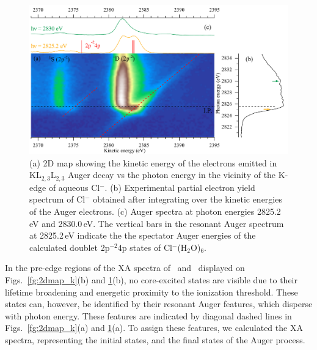 \begin{figure}[h!]
\centering
\includegraphics[scale=0.55]{figures/cl_2dmap.pdf}
\caption{(a) 2D map showing the kinetic energy of the electrons emitted in KL$_{2,3}$L$_{2,3}$ Auger decay vs the photon energy in the vicinity of the K-edge of aqueous Cl$^{-}$. 
(b) Experimental partial electron yield spectrum of Cl$^{-}$ obtained after integrating over the kinetic energies of the Auger electrons. 
(c) Auger spectra at photon energies 2825.2\,eV and 2830.0\,eV. The vertical bars in the resonant Auger spectrum at 2825.2\,eV indicate the the spectator Auger energies of the calculated doublet 2p$^{-2}$4p states of Cl$^{-}$(H$_2$O)$_6$.}
\label{fg:2dmap_cl}
\end{figure}

{\color{blue} In the pre-edge regions of the XA spectra of \ki~and \cli~displayed on Figs.\ \ref{fg:2dmap_k}(b) and \ref{fg:2dmap_cl}(b), no core-excited states are visible due to their lifetime broadening and energetic proximity to the ionization threshold. These states can, however, be identified by their resonant Auger features, which disperse with photon energy. These features are indicated by diagonal dashed lines in Figs.\ \ref{fg:2dmap_k}(a) and \ref{fg:2dmap_cl}(a). To assign these features, we calculated the XA spectra, representing the initial states, and the final states of the Auger process.}

